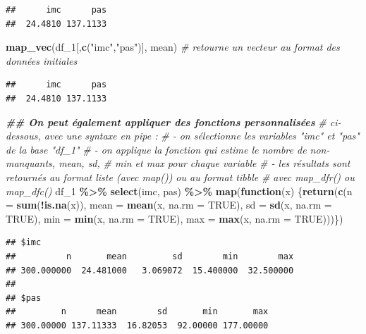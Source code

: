 \documentclass[
]{book}
\newenvironment{Shaded}{\begin{snugshade}}{\end{snugshade}}
\newcommand{\AttributeTok}[1]{\textcolor[rgb]{0.13,0.29,0.53}{#1}}
\newcommand{\CommentTok}[1]{\textcolor[rgb]{0.56,0.35,0.01}{\textit{#1}}}
\newcommand{\ConstantTok}[1]{\textcolor[rgb]{0.56,0.35,0.01}{#1}}
\newcommand{\ControlFlowTok}[1]{\textcolor[rgb]{0.13,0.29,0.53}{\textbf{#1}}}
\newcommand{\DocumentationTok}[1]{\textcolor[rgb]{0.56,0.35,0.01}{\textbf{\textit{#1}}}}
\newcommand{\FunctionTok}[1]{\textcolor[rgb]{0.13,0.29,0.53}{\textbf{#1}}}
\newcommand{\NormalTok}[1]{#1}
\newcommand{\SpecialCharTok}[1]{\textcolor[rgb]{0.81,0.36,0.00}{\textbf{#1}}}
\newcommand{\StringTok}[1]{\textcolor[rgb]{0.31,0.60,0.02}{#1}}
\begin{document}
\begin{verbatim}
##      imc      pas 
##  24.4810 137.1133
\end{verbatim}

\begin{Shaded}
\begin{Highlighting}[]
\FunctionTok{map\_vec}\NormalTok{(df\_1[,}\FunctionTok{c}\NormalTok{(}\StringTok{"imc"}\NormalTok{,}\StringTok{"pas"}\NormalTok{)], mean) }\CommentTok{\# retourne un vecteur au format des données initiales}
\end{Highlighting}
\end{Shaded}

\begin{verbatim}
##      imc      pas 
##  24.4810 137.1133
\end{verbatim}

\begin{Shaded}
\begin{Highlighting}[]
\DocumentationTok{\#\# On peut également appliquer des fonctions personnalisées}
\CommentTok{\# ci{-}dessous, avec une syntaxe en pipe : }
\CommentTok{\#  {-} on sélectionne les variables "imc" et "pas" de la base "df\_1"}
\CommentTok{\#  {-} on applique la fonction qui estime le nombre de non{-}manquants, mean, sd, }
\CommentTok{\#    min et max pour chaque variable}
\CommentTok{\#  {-} les résultats sont retournés au format liste (avec map()) ou au format tibble }
\CommentTok{\#    avec map\_dfr() ou map\_dfc()}
\NormalTok{df\_1 }\SpecialCharTok{\%\textgreater{}\%}
  \FunctionTok{select}\NormalTok{(imc, pas) }\SpecialCharTok{\%\textgreater{}\%}
  \FunctionTok{map}\NormalTok{(}\ControlFlowTok{function}\NormalTok{(x) \{}\FunctionTok{return}\NormalTok{(}\FunctionTok{c}\NormalTok{(}\AttributeTok{n =} \FunctionTok{sum}\NormalTok{(}\SpecialCharTok{!}\FunctionTok{is.na}\NormalTok{(x)),}
                            \AttributeTok{mean =} \FunctionTok{mean}\NormalTok{(x, }\AttributeTok{na.rm =} \ConstantTok{TRUE}\NormalTok{),}
                            \AttributeTok{sd =} \FunctionTok{sd}\NormalTok{(x, }\AttributeTok{na.rm =} \ConstantTok{TRUE}\NormalTok{),}
                            \AttributeTok{min =} \FunctionTok{min}\NormalTok{(x, }\AttributeTok{na.rm =} \ConstantTok{TRUE}\NormalTok{),}
                            \AttributeTok{max =} \FunctionTok{max}\NormalTok{(x, }\AttributeTok{na.rm =} \ConstantTok{TRUE}\NormalTok{)))\})}
\end{Highlighting}
\end{Shaded}

\begin{verbatim}
## $imc
##          n       mean         sd        min        max 
## 300.000000  24.481000   3.069072  15.400000  32.500000 
## 
## $pas
##         n      mean        sd       min       max 
## 300.00000 137.11333  16.82053  92.00000 177.00000
\end{verbatim}
\end{document}
